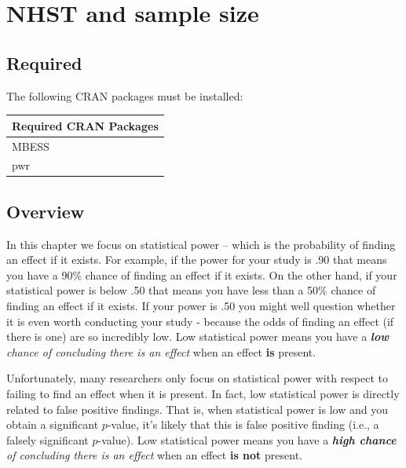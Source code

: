 \documentclass[
]{krantz}
\begin{document}
\hypertarget{nhst-and-sample-size}{%
\chapter{NHST and sample size}\label{nhst-and-sample-size}}

\hypertarget{required-4}{%
\section{Required}\label{required-4}}

The following CRAN packages must be installed:

\begin{longtable}[]{@{}l@{}}
\toprule
Required CRAN Packages \\
\midrule
\endhead
MBESS \\
pwr \\
\bottomrule
\end{longtable}

\hypertarget{overview-4}{%
\section{Overview}\label{overview-4}}

In this chapter we focus on statistical power -- which is the probability of finding an effect if it exists. For example, if the power for your study is .90 that means you have a 90\% chance of finding an effect if it exists. On the other hand, if your statistical power is below .50 that means you have less than a 50\% chance of finding an effect if it exists. If your power is .50 you might well question whether it is even worth conducting your study - because the odds of finding an effect (if there is one) are so incredibly low. Low statistical power means you have a \emph{\textbf{low} chance of concluding there is an effect} when an effect \textbf{is} present.

Unfortunately, many researchers only focus on statistical power with respect to failing to find an effect when it is present. In fact, low statistical power is directly related to false positive findings. That is, when statistical power is low and you obtain a significant \(p\)-value, it's likely that this is false positive finding (i.e., a falsely significant \(p\)-value). Low statistical power means you have a \emph{\textbf{high chance} of concluding there is an effect} when an effect \textbf{is not} present.
\end{document}
